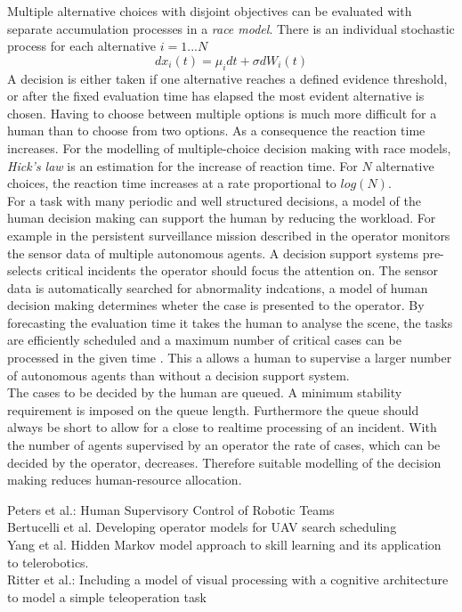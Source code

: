 \documentclass[a4paper,twoside, openright,12pt]{report}
\begin{document}
Multiple alternative choices with disjoint objectives can be evaluated with separate accumulation processes in a \emph{race model}. There is an individual stochastic process for each alternative $i=1...N$
\begin{equation}
dx_i(t) = \mu_i dt + \sigma dW_i(t)
\end{equation}
 A decision is either taken if one alternative reaches a defined evidence threshold, or after the fixed evaluation time has elapsed the most evident alternative is chosen. Having to choose between multiple options is much more difficult for a human than to choose from two options. As a consequence the reaction time increases. For the modelling of multiple-choice decision making with race models, \emph{Hick's law} is an estimation for the increase of reaction time. For $N$ alternative choices, the reaction time increases at a rate proportional to $log(N)$.\\
For a task with many periodic and well structured decisions, a model of the human decision making can support the human by reducing the workload.  For example in the persistent surveillance mission described in \cite{Peters2015} the operator monitors the sensor data of multiple autonomous agents. A decision support systems pre-selects critical incidents the operator should focus the attention on. The sensor data is automatically searched for abnormality indcations, a model of human decision making determines wheter the case is presented to the operator. By forecasting the evaluation time it takes the human to analyse the scene, the tasks are efficiently scheduled and a maximum number of critical cases can be processed in the given time \cite{Bertuccelli2010}. This a allows a human to supervise a larger number of autonomous agents than without a decision support system.\\
The cases to be decided by the human are queued. A minimum stability requirement is imposed on the queue length. Furthermore the queue should always be short to allow for a close to realtime processing of an incident. With the number of agents supervised by an operator the rate of cases,  which can be decided by the operator, decreases. Therefore suitable modelling of the decision making      reduces human-resource allocation.
        

Peters et al.: Human Supervisory Control of Robotic Teams\\
Bertucelli et al. Developing operator models for {UAV} search scheduling\\
Yang et al. Hidden Markov model approach to skill learning and its application to telerobotics.\\
Ritter et al.: Including a model of visual processing with a cognitive architecture to model a simple teleoperation task\\
\end{document}
